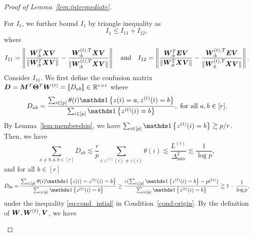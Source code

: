 \documentclass[lettersize,onecolumn,journal]{IEEEtran}
\theoremstyle{definition}
\theoremstyle{definition}
\newcommand{\of}[1]{\left(#1\right)}
\newcommand{\offf}[1]{\left\{#1\right\}}
\begin{document}
\begin{proof}[Proof of Lemma~\ref{lem:intermediate}]
\begin{enumerate}
    For $I_1$, we further bound $I_1$ by triangle inequality as
    \begin{equation}
        I_1 \leq I_{11} + I_{12},
    \end{equation}
    where
     \begin{equation}
        I_{11} = \left\lVert \frac{ \bm{W}_{:b}^T \bm X \bm{V}  }{\lVert  \bm{W}_{:b}^T \bm X \bm{V} \rVert} - \frac{ \bm{W}_{:b}^{(t), T} \bm X \bm{V}  }{ \lVert\bm{W}_{:b}^{(t), T} \bm X \bm{V} \rVert}   \right\rVert \quad \text{and} \quad I_{12} = \left\lVert \frac{\bm{W}_{:b}^T \bm{E} \bm{V}}{ \lVert  \bm{W}_{:b}^T \bm X \bm{V} \rVert} - \frac{\bm{W}_{:b}^{(t),T} \bm{E} \bm{V}}{ \lVert  \bm{W}_{:b}^{(t),T} \bm X \bm{V} \rVert} \right\rVert.
    \end{equation}
    Consider $I_{11}$. We first define the confusion matrix $\bm{D} = \bm M^T \boldsymbol{\Theta}^T \bm{W}^{(t)} = \llbracket D_{ab} \rrbracket \in \mathbb{R}^{r \times r}$ where 
    \begin{equation}
        D_{ab} = \frac{\sum_{i \in [p]}  \theta(i) \ind \offf{ z(i) = a, z^{(t)}(i) = b } }{\sum_{i \in [p]}  \ind\offf{  z^{(t)}(i) = b }}, \text{  for all } a, b \in [r].
    \end{equation}
    By Lemma~\ref{lem:membership},  we have $\sum_{i \in [p]}  \ind\offf{  z^{(t)}(i) = b } \gtrsim p/r$. Then, we have
    \begin{equation}\label{eq:dab_bound}
        \sum_{a \neq b, a,b \in [r]} D_{ab} \lesssim \frac{r}{p} \sum_{i \colon z^{(t)}(i) \neq z(i)} \theta(i) \lesssim\frac{L^{(t)}}{\Delta_{\min}^2}  \lesssim \frac{1}{\log p}, 
    \end{equation}
    and for all $b \in [r]$
    \begin{equation}\label{eq:dbb_bound}
        D_{bb} = \frac{\sum_{i \in [p]}  \theta(i) \ind \offf{ z(i) = z^{(t)}(i) = b } }{\sum_{i \in [p]}  \ind\offf{  z^{(t)}(i) = b }} \geq \frac{c(\sum_{i \in [p]}  \ind\offf{  z^{(t)}(i) = b } - p\ell^{(t)})}{\sum_{i \in [p]}  \ind\offf{  z^{(t)}(i) = b }} \gtrsim 1 - \frac{1}{\log p},
    \end{equation}
    under the inequality \eqref{eq:cond_intial} in Condition~\ref{cond:origin}. By the definition of $\bm{W},\bm{W}^{(t)},\bm{V}$, we have 

\end{enumerate}
\end{proof}
\end{document}
